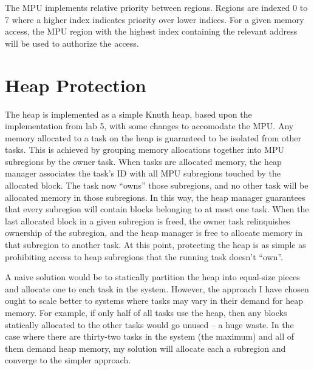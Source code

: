 The MPU implements relative priority between regions. Regions are indexed 0 to 7 where a higher index indicates priority over lower indices. For a given memory access, the MPU region with the highest index containing the relevant address will be used to authorize the access.

\section{Heap Protection}

The heap is implemented as a simple Knuth heap, based upon the implementation from lab 5, with some changes to accomodate the MPU. Any memory allocated to a task on the heap is guaranteed to be isolated from other tasks. This is achieved by grouping memory allocations together into MPU subregions by the owner task. When tasks are allocated memory, the heap manager associates the task's ID with all MPU subregions touched by the allocated block. The task now ``owns'' those subregions, and no other task will be allocated memory in those subregions. In this way, the heap manager guarantees that every subregion will contain blocks belonging to at most one task. When the last allocated block in a given subregion is freed, the owner task relinquishes ownership of the subregion, and the heap manager is free to allocate memory in that subregion to another task. At this point, protecting the heap is as simple as prohibiting access to heap subregions that the running task doesn't ``own''.

A naive solution would be to statically partition the heap into equal-size pieces and allocate one to each task in the system. However, the approach I have chosen ought to scale better to systems where tasks may vary in their demand for heap memory. For example, if only half of all tasks use the heap, then any blocks statically allocated to the other tasks would go unused -- a huge waste. In the case where there are thirty-two tasks in the system (the maximum) and all of them demand heap memory, my solution will allocate each a subregion and converge to the simpler approach.

